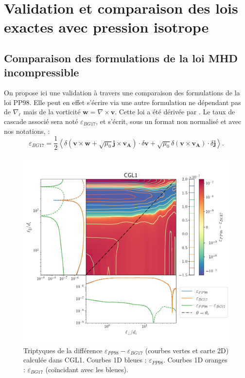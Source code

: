 \chapter{Validation et comparaison des lois exactes avec pression isotrope}
\renewcommand\partie{\Partie\ Chapitre \thechapter}
\label{an:B}

\section{Comparaison des formulations de la loi MHD incompressible} \label{an:compa_BG17}

On propose ici une validation à travers une comparaison des formulations de la loi PP98. Elle peut en effet s'écrire via une autre formulation ne dépendant pas de $\nabla_{\boldsymbol{\ell}}$ mais de la vorticité $\boldsymbol{w} = \nabla \times \boldsymbol{v}$. Cette loi a été dérivée par \cite{banerjee_exact_2017}. Le taux de cascade associé sera noté $\varepsilon_{BG17}$, et s'écrit, sous un format non normalisé et avec nos notations, : 
\begin{equation}
    \varepsilon_{BG17} = \frac{1}{2} \left< \delta\left(\boldsymbol{v} \times \boldsymbol{w} + \sqrt{\mu_0} \boldsymbol{j} \times\boldsymbol{v_A}\right) \cdot \delta \boldsymbol{v} + \sqrt{\mu_0} \delta\left(\boldsymbol{v}\times \boldsymbol{v_A}\right)\cdot \delta \boldsymbol{j}\right> .
\end{equation}
\begin{figure}[!ht]
 \centering
\includegraphics[width=0.8\linewidth,trim=0cm 1cm 0cm 1.5cm, clip=true]{./Part_3/images_ch2/CGL1_BG17}
\cprotect\caption{Triptyques de la différence $\varepsilon_{PP98}-\varepsilon_{BG17}$ (courbes vertes et carte 2D) calculée dans CGL1. Courbes 1D bleues : $\varepsilon_{PP98}$. Courbes 1D oranges : $\varepsilon_{BG17}$ (coïncidant avec les bleues).}
\label{fig:BG17}
\end{figure}
